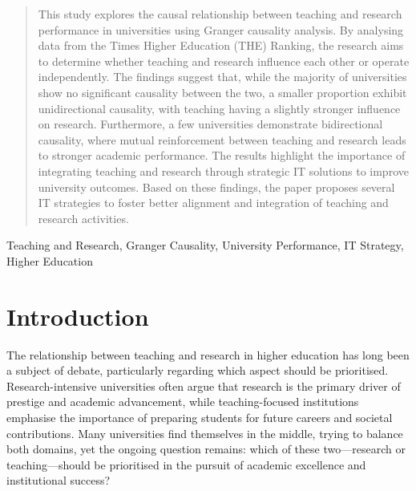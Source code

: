 \documentclass[a4paper, conference]{IEEEtran}
\begin{document}
\newcommand{\al}[1]{{\textbf{\color{blue} Al: #1}}}

\maketitle

\begin{abstract}
This study explores the causal relationship between teaching and research performance in universities using Granger causality analysis. By analysing data from the Times Higher Education (THE) Ranking, the research aims to determine whether teaching and research influence each other or operate independently. The findings suggest that, while the majority of universities show no significant causality between the two, a smaller proportion exhibit unidirectional causality, with teaching having a slightly stronger influence on research. Furthermore, a few universities demonstrate bidirectional causality, where mutual reinforcement between teaching and research leads to stronger academic performance. The results highlight the importance of integrating teaching and research through strategic IT solutions to improve university outcomes. Based on these findings, the paper proposes several IT strategies to foster better alignment and integration of teaching and research activities.
\end{abstract}

\begin{IEEEkeywords}
Teaching and Research, Granger Causality, University Performance, IT Strategy, Higher Education
\end{IEEEkeywords}


\section{Introduction}
\label{sec:introduction}

The relationship between teaching and research in higher education has long been a subject of debate, particularly regarding which aspect should be prioritised. Research-intensive universities often argue that research is the primary driver of prestige and academic advancement, while teaching-focused institutions emphasise the importance of preparing students for future careers and societal contributions. Many universities find themselves in the middle, trying to balance both domains, yet the ongoing question remains: which of these two—research or teaching—should be prioritised in the pursuit of academic excellence and institutional success?
\end{document}
